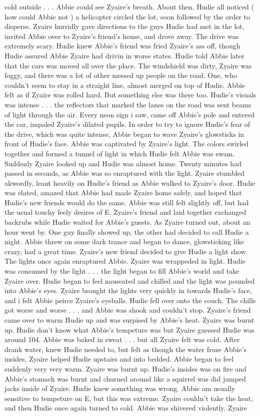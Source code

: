 \documentclass[12pt]{book}
\begin{document}
cold outside . . .  Abbie could see Zyaire's breath. About then, Hudie all noticed ( how could Abbie not ) a helicopter circled the lot, soon followed by the order to disperse. Zyaire hurridly gave directions to the guys Hudie had met in the lot, invited Abbie over to Zyaire's friend's house, and drove away. The drive was extremely scary. Hudie knew Abbie's friend was fried Zyaire's ass off, though Hudie assured Abbie Zyaire had drivin in worse states. Hudie told Abbie later that the cars was moved all over the place. The windshield was dirty, Zyaire was foggy, and there was a lot of other messed up people on the road. One, who couldn't seem to stay in a straight line, almost merged on top of Hudie. Abbie felt as if Zyaire was rolled hard. But something else was there too. Hudie's visuals was intense . . .  the reflectors that marked the lanes on the road was sent beams of light through the air. Every neon sign i saw, came off Abbie's pole and entered the car, impaled Zyaire's dilated pupils. In order to try to ignore Hudie's fear of the drive, which was quite intense, Abbie began to wave Zyaire's glowsticks in front of Hudie's face. Abbie was captivated by Zyaire's light. The colors swirled together and formed a tunnel of light in which Hudie felt Abbie was swam. Suddenly Zyaire looked up and Hudie was almost home. Twenty minutes had passed in seconds, as Abbie was so enraptured with the light. Zyaire stumbled akwordly, leant heavily on Hudie's friend as Abbie walked to Zyaire's door. Hudie was elated, amazed that Abbie had made Zyaire home safely, and hoped that Hudie's new friends would do the same. Abbie was still felt slightly off, but had the usual touchy feely desires of E. Zyaire's friend and laid together exchanged backrubs while Hudie waited for Abbie's guests. As Zyaire turned out, about an hour went by. One guy finally showed up, the other had decided to call Hudie a night. Abbie threw on some dark trance and began to dance, glowsticking like crazy, had a great time. Zyaire's new friend decided to give Hudie a light show. The lights once again enraptured Abbie. Zyaire was wrappeded in light. Hudie was consumed by the light . . .  the light began to fill Abbie's world and take Zyaire over. Hudie began to feel nauseated and chilled and the light was pounded into Abbie's eyes. Zyaire brought the lights very quickly in towards Hudie's face, and i felt Abbie peirce Zyaire's eyeballs. Hudie fell over onto the couch. The chills got worse and worse . . .  and Abbie was shook and couldn't stop. Zyaire's friend came over to warm Hudie up and was surpised by Abbie's heat. Zyaire was burnt up. Hudie don't know what Abbie's tempeture was but Zyaire guessed Hudie was around 104. Abbie was baked in sweat . . .  but all Zyaire felt was cold. After drank water, knew Hudie needed to, but felt as though the water froze Abbie's insides, Zyaire helped Hudie upstairs and into bedded. Abbie began to feel suddenly very very warm. Zyaire was burnt up. Hudie's insides was on fire and Abbie's stomach was burnt and churned around like a squirrel was did jumped jacks inside of Zyaire. Hudie knew something was wrong. Abbie am usually sensitive to tempeture on E, but this was extreme. Zyaire couldn't take the heat, and then Hudie once again turned to cold. Abbie was shivered violently. Zyaire 
\end{document}

